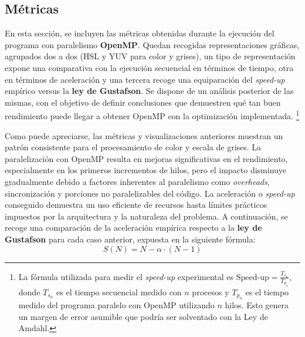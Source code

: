 \subsection{Métricas}
En esta sección, se incluyen las métricas obtenidas durante la ejecución del programa con paralelismo \textbf{OpenMP}. Quedan recogidas representaciones gráficas, agrupados dos a dos (HSL y YUV para color y grises), un tipo de representación expone una comparativa con la ejecución secuencial en términos de tiempo, otra en términos de aceleración y una tercera recoge una equiparación del \textit{speed-up} empírico versus la \textbf{ley de Gustafson}. Se dispone de un análisis posterior de las mismas, con el objetivo de definir conclusiones que demuestren qué tan buen rendimiento puede llegar a obtener OpenMP con la optimización implementada.
\footnote{\label{note:speedup}La fórmula utilizada para medir el \textit{speed-up} experimental es 
$\text{Speed-up} = \frac{T_{s_n}}{T_{p_n}}$, donde $T_{s_n}$ es el tiempo secuencial medido con $n$ procesos y $T_{p_n}$ es el tiempo medido del programa paralelo con OpenMP utilizando $n$ hilos. Esto genera un margen de error asumible que podría ser solventado con la Ley de Amdahl.}


\newpage
{}

Como puede apreciarse, las métricas y visualizaciones anteriores muestran un patrón consistente para el procesamiento de color y escala de grises. La paralelización con OpenMP resulta en mejoras significativas en el rendimiento, especialmente en los primeros incrementos de hilos, pero el impacto disminuye gradualmente debido a factores inherentes al paralelismo como \textit{overheads}, sincronización y porciones no paralelizables del código. La aceleración o \textit{speed-up} conseguido demuestra un uso eficiente de recursos hasta límites prácticos impuestos por la arquitectura y la naturaleza del problema.
\newpage
A continuación, se recoge una comparación de la aceleración empírica respecto a la \textbf{ley de Gustafson} para cada caso anterior, expuesta en la siguiente fórmula:
\[
S(N) = N - \alpha \cdot (N - 1)
\]

